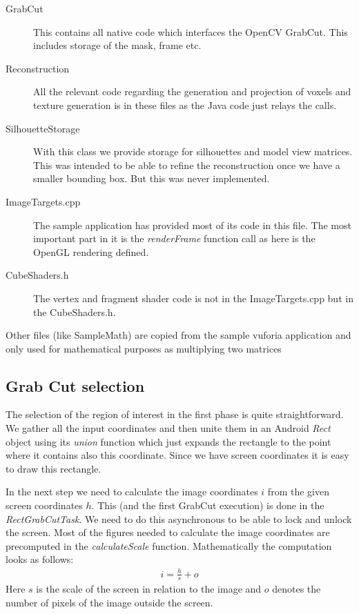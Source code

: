 \documentclass[10pt,twocolumn,letterpaper]{article}
\begin{document}
\begin{description}
	\item[GrabCut] This contains all native code which interfaces the OpenCV GrabCut. This includes storage of the mask, frame etc.
	\item[Reconstruction] All the relevant code regarding the generation and projection of voxels and texture generation is in these files as the Java code just relays the calls.
	\item[SilhouetteStorage] With this class we provide storage for silhouettes and model view matrices. This was intended to be able to refine the reconstruction once we have a smaller bounding box. But this was never implemented.
	\item[ImageTargets.cpp] The sample application has provided most of its code in this file. The most important part in it is the \emph{renderFrame} function call as here is the OpenGL rendering defined.
	\item[CubeShaders.h] The vertex and fragment shader code is not in the ImageTargets.cpp but in the CubeShaders.h.
\end{description}

Other files (like SampleMath) are copied from the sample vuforia application and only used for mathematical purposes as multiplying two matrices


\subsection{Grab Cut selection}

The selection of the region of interest in the first phase is quite straightforward. We gather all the input coordinates and then unite them in an Android \emph{Rect} object using its \emph{union} function which just expands the rectangle to the point where it contains also this coordinate. Since we have screen coordinates it is easy to draw this rectangle.

In the next step we need to calculate the image coordinates $i$ from the given screen coordinates $h$. This (and the first GrabCut execution) is done in the \emph{RectGrabCutTask}. We need to do this asynchronous to be able to lock and unlock the screen. Most of the figures needed to calculate the image coordinates are precomputed in the \emph{calculateScale} function. Mathematically the computation looks as follows:
\begin{align} \label{imgCoord}
	i = \frac{h}{s} + o
\end{align}
Here $s$ is the scale of the screen in relation to the image and $o$ denotes the number of pixels of the image outside the screen.
\end{document}
